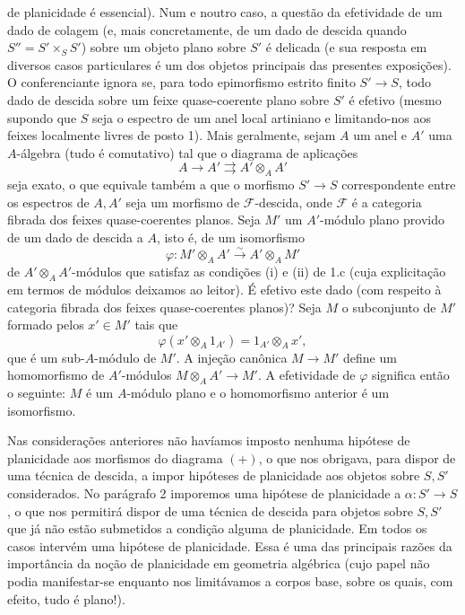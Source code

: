 de planicidade é essencial). Num e noutro caso, a questão da efetividade de
um dado de colagem (e, mais concretamente, de um dado de descida quando
$S''=S'\times_SS'$) sobre um objeto plano sobre $S'$ é delicada (e sua
resposta em diversos casos particulares é um dos objetos principais das
presentes exposições). O conferenciante ignora se, para todo epimorfismo
estrito finito $S'\longrightarrow S$, todo dado de descida sobre um feixe
quase-coerente plano sobre $S'$ é efetivo (mesmo supondo que $S$ seja o
espectro de um anel local artiniano e limitando-nos aos feixes localmente
livres de posto 1). Mais geralmente, sejam $A$ um anel e $A'$ uma
$A$-álgebra (tudo é comutativo) tal que o diagrama de aplicações
\[
  A\longrightarrow A'\rightrightarrows A'\otimes_AA'
\]
seja exato, o que equivale também a que o morfismo
$S'\longrightarrow S$ correspondente entre os espectros de $A,A'$ seja um
morfismo de $\mathcal F$-descida, onde $\mathcal F$ é a categoria fibrada
dos feixes quase-coerentes planos. Seja $M'$ um $A'$-módulo plano provido de
um dado de descida a $A$, isto é, de um isomorfismo
\[
  \varphi:M'\otimes_AA'\xrightarrow{\sim}A'\otimes_AM'
\]
de $A'\otimes_AA'$-módulos que satisfaz as condições (i) e (ii) de 1.c
(cuja explicitação em termos de módulos deixamos ao leitor). É efetivo
este dado (com respeito à categoria fibrada dos feixes quase-coerentes
planos)? Seja $M$ o subconjunto de $M'$ formado pelos $x'\in M'$ tais que
\[
  \varphi(x'\otimes_A1_{A'})=1_{A'}\otimes_Ax',
\]
que é um sub-$A$-módulo de $M'$. A injeção canônica
$M\longrightarrow M'$ define um homomorfismo de $A'$-módulos
$M\otimes_AA'\longrightarrow M'$. A efetividade de $\varphi$ significa
então o seguinte: $M$ é um $A$-módulo plano e o homomorfismo anterior é
um isomorfismo.

 Nas considerações anteriores não havíamos imposto
nenhuma hipótese de planicidade aos morfismos do diagrama $(+)$, o que nos
obrigava, para dispor de uma técnica de descida, a impor hipóteses de
planicidade aos objetos sobre $S,S'$ considerados. No parágrafo 2 imporemos
uma hipótese de planicidade a $\alpha:S'\longrightarrow S$, o que nos permitirá
dispor de uma técnica de descida para objetos sobre $S,S'$ que já não estão
submetidos a condição alguma de planicidade. Em todos os casos intervém uma
hipótese de planicidade. Essa é uma das principais razões da importância da
noção de planicidade em geometria algébrica (cujo papel não podia manifestar-se
enquanto nos limitávamos a corpos base, sobre os quais, com efeito, tudo é
plano!).

